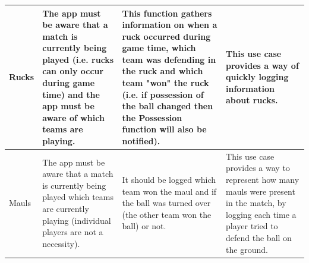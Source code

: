 \documentclass[a4paper,12pt]{report}
\begin{document}
\begin{center}
\begin{longtable}{| p{3cm} | p{4cm} | p{4cm} | p{4cm} |}
    Rucks & The app must be aware that a match is currently being played (i.e. rucks can only occur during game time) and the app must be aware of which teams are playing. & This function gathers information on when a ruck occurred during game time, which team was defending in the ruck and which team "won" the ruck (i.e. if possession of the ball changed then the Possession function will also be notified). & This use case provides a way of quickly logging information about rucks.\\ \hline
    Mauls & The app must be aware that a match is currently being played which teams are currently playing (individual players are not a necessity). & It should be logged which team won the maul and if the ball was turned over (the other team won the ball) or not. & This use case provides a way to represent how many mauls were present in the match, by logging each time a player tried to defend the ball on the ground.\\ \hline

    \hline
  \end{longtable}
\end{center}
\newpage
\end{document}
